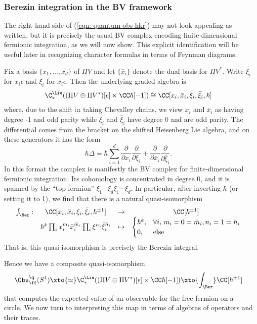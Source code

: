 \documentclass[10pt]{amsart}
\begin{document}
\subsubsection{Berezin integration in the BV framework}

The right hand side of (\ref{eqn: quantum obs hkr}) may not look appealing as written, 
but it is precisely the usual BV complex encoding finite-dimensional fermionic integration,
as we will now show.
This explicit identification will be useful later in recognizing character formulas in terms of Feynman diagrams.

Fix a basis $\{x_1,\ldots,x_d\}$ of $\Pi V$ and let $\{\bar{x}_i\}$ denote the dual basis for $\Pi V^*$.
Write $\xi_i$ for $\bar{x}_i \epsilon$ and $\bar{\xi}_i$ for $x_i \epsilon$.
Then the underlying graded algebra is
\[
\C_*^\Lie((\Pi V \oplus \Pi V^*)[\epsilon]\ltimes \CC \hbar[-1]) \cong \CC[x_i,\bar{x}_i,\xi_i,\bar{\xi}_i,\hbar]
\]
where, due to the shift in taking Chevalley chains, we view $x_i$ and $\bar{x}_i$ as having degree -1 and odd parity while $\xi_i$ and $\bar{\xi}_i$ have degree 0 and are odd parity.
The differential comes from the bracket on the shifted Heisenberg Lie algebra, and on these generators  it has the form
\[
\hbar \Delta = \hbar \sum_{i =1}^d \frac{\partial}{\partial x_i}\frac{\partial}{\partial \xi_i} +\frac{\partial}{\partial \bar{x}_i}\frac{\partial}{\partial \bar{\xi}_i}.
\]
In this format the complex is manifestly the BV complex for finite-dimensional fermionic integration.
Its cohomology is concentrated in degree 0, and it is spanned by the ``top fermion'' $\xi_1 \cdots \xi_d \bar{\xi}_1 \cdots \bar{\xi}_d$.
In particular, after inverting $\hbar$ (or setting it to 1), we find that there is a natural quasi-isomorphism
\[
\begin{array}{cccc}
\int_\Ber: & \CC[x_i,\bar{x}_i,\xi_i,\bar{\xi}_i,\hbar^{\pm 1}] &\to& \CC[\hbar^{\pm 1}]\\
&  \hbar^k \prod_i x_i^{m_i} \bar{x}_i^{\bar{m}_i} \prod_i \xi^{n_i} \bar{\xi}_i^{\bar{n}_i} & \mapsto & \begin{cases} 
\hbar^k, &  \forall i,\,m_i = 0 = \bar{m}_i, n_i = 1 = \bar{n}_i \\
0,& \text{else}
\end{cases}
\end{array}
\]
That is, this quasi-isomorphism is precisely the Berezin integral.

Hence we have a composite quasi-isomorphism
\[
\Obs^\q_\ff(S^1) \xto{\simeq} \C_*^\Lie((\Pi V \oplus \Pi V^*)[\epsilon]\ltimes \CC \hbar[-1]) \xto{\int_\Ber}  \CC[\hbar^{\pm 1}]
\]
that computes the expected value of an observable for the free fermion on a circle.
We now turn to interpreting this map in terms of algebras of operators and their traces.
\end{document}
